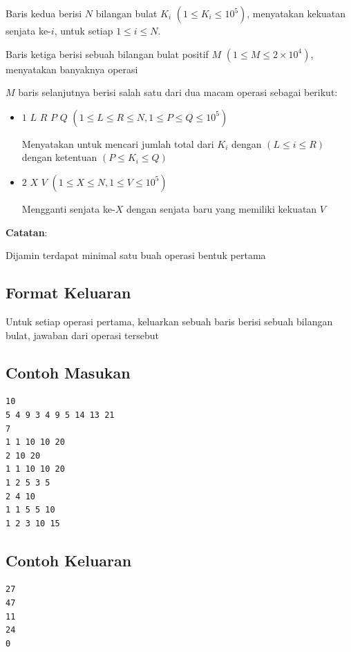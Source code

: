 \documentclass{article}
\begin{document}
Baris kedua berisi $N$ bilangan bulat $K_i$ $(1 \leq K_i \leq 10^5)$, menyatakan kekuatan senjata ke-$i$, untuk setiap $1 \leq i \leq N$.

Baris ketiga berisi sebuah bilangan bulat positif $M$ $(1 \leq M \leq 2 \times 10^4)$, menyatakan banyaknya operasi

$M$ baris selanjutnya berisi salah satu dari dua macam operasi sebagai berikut:

\begin{itemize}

\item $1$ $L$ $R$ $P$ $Q$ $(1 \leq L \leq R \leq N, 1 \leq P \leq Q \leq 10^5)$

Menyatakan untuk mencari jumlah total dari $K_i$ dengan $(L \leq i \leq R)$ dengan ketentuan $(P \leq K_i \leq Q)$

\item $2$ $X$ $V$ $(1 \leq X \leq N, 1 \leq V \leq 10^5)$

Mengganti senjata ke-$X$ dengan senjata baru yang memiliki kekuatan $V$

\end{itemize}

\textbf{Catatan}:

Dijamin terdapat minimal satu buah operasi bentuk pertama

\subsection*{Format Keluaran}

Untuk setiap operasi pertama, keluarkan sebuah baris berisi sebuah bilangan bulat, jawaban dari operasi tersebut

\begin{multicols}{2}
\subsection*{Contoh Masukan}
\begin{lstlisting}
10
5 4 9 3 4 9 5 14 13 21
7
1 1 10 10 20
2 10 20
1 1 10 10 20
1 2 5 3 5
2 4 10
1 1 5 5 10
1 2 3 10 15

\end{lstlisting}
\columnbreak
\subsection*{Contoh Keluaran}
\begin{lstlisting}
27
47
11
24
0
\end{lstlisting}
\vfill
\null
\end{multicols}
\end{document}
